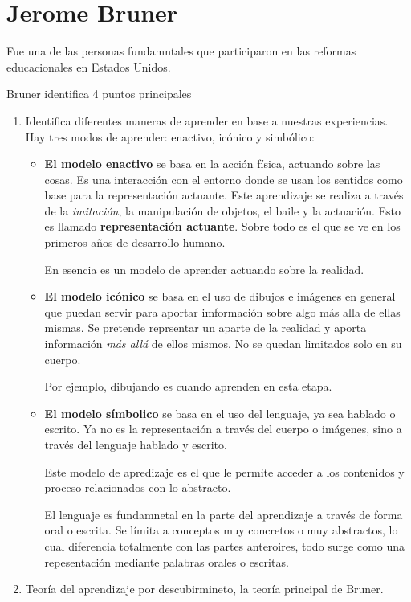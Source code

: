 \documentclass[12pt]{report}
\theoremstyle{largebreak}
\begin{document}
    \section{Jerome Bruner}

    Fue una de las personas fundamntales que participaron en las reformas educacionales en Estados Unidos.

    Bruner identifica 4 puntos principales

    \begin{enumerate}
        \item Identifica diferentes maneras de aprender en base a nuestras experiencias. Hay tres modos de aprender: enactivo, icónico y simbólico:
        \begin{itemize}
            \item \textbf{El modelo enactivo} se basa en la acción física, actuando sobre las cosas. Es una interacción con el entorno donde se usan los sentidos como base para la representación actuante. Este aprendizaje se realiza a través de la \textit{imitación}, la manipulación de objetos, el baile y la actuación. Esto es llamado \textbf{representación actuante}. Sobre todo es el que se ve en los primeros años de desarrollo humano.
            
            En esencia es un modelo de aprender actuando sobre la realidad.
            \item \textbf{El modelo icónico} se basa en el uso de dibujos e imágenes en general que puedan servir para aportar imformación sobre algo más alla de ellas mismas. Se pretende reprsentar un aparte de la realidad y aporta información \textit{más allá} de ellos mismos. No se quedan limitados solo en su cuerpo.
            
            Por ejemplo, dibujando es cuando aprenden en esta etapa.

            \item \textbf{El modelo símbolico} se basa en el uso del lenguaje, ya sea hablado o escrito. Ya no es la representación a través del cuerpo o imágenes, sino a través del lenguaje hablado y escrito.
            
            Este modelo de apredizaje es el que le permite acceder a los contenidos y proceso relacionados con lo abstracto.

            El lenguaje es fundamnetal en la parte del aprendizaje a través de forma oral o escrita. Se límita a conceptos muy concretos o muy abstractos, lo cual diferencia totalmente con las partes anteroires, todo surge como una repesentación mediante palabras orales o escritas.
        \end{itemize}
        \item Teoría del aprendizaje por descubirmineto, la teoría principal de Bruner.
        

\end{enumerate}
\end{document}
